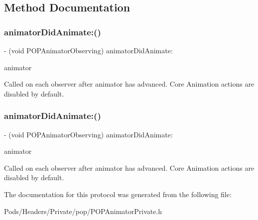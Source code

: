 \subsection{Method Documentation}
\mbox{\label{protocol_p_o_p_animator_observing_01-p_abd80662e73b3b9f9309a91d21b27aae0}} 
\subsubsection{\texorpdfstring{animator\+Did\+Animate\+:()}{animatorDidAnimate:()}\hspace{0.1cm}{\footnotesize\ttfamily [1/2]}}
{\footnotesize\ttfamily -\/ (void P\+O\+P\+Animator\+Observing) animator\+Did\+Animate\+: \begin{DoxyParamCaption}\item[{(\mbox{\hyperlink{interface_p_o_p_animator}{P\+O\+P\+Animator}} $\ast$)}]{animator }\end{DoxyParamCaption}\hspace{0.3cm}{\ttfamily [required]}}

Called on each observer after animator has advanced. Core Animation actions are disabled by default. \mbox{\label{protocol_p_o_p_animator_observing_01-p_abd80662e73b3b9f9309a91d21b27aae0}} 
\subsubsection{\texorpdfstring{animator\+Did\+Animate\+:()}{animatorDidAnimate:()}\hspace{0.1cm}{\footnotesize\ttfamily [2/2]}}
{\footnotesize\ttfamily -\/ (void P\+O\+P\+Animator\+Observing) animator\+Did\+Animate\+: \begin{DoxyParamCaption}\item[{(\mbox{\hyperlink{interface_p_o_p_animator}{P\+O\+P\+Animator}} $\ast$)}]{animator }\end{DoxyParamCaption}\hspace{0.3cm}{\ttfamily [required]}}

Called on each observer after animator has advanced. Core Animation actions are disabled by default. 

The documentation for this protocol was generated from the following file\+:\begin{DoxyCompactItemize}
\item 
Pods/\+Headers/\+Private/pop/P\+O\+P\+Animator\+Private.\+h\end{DoxyCompactItemize}
